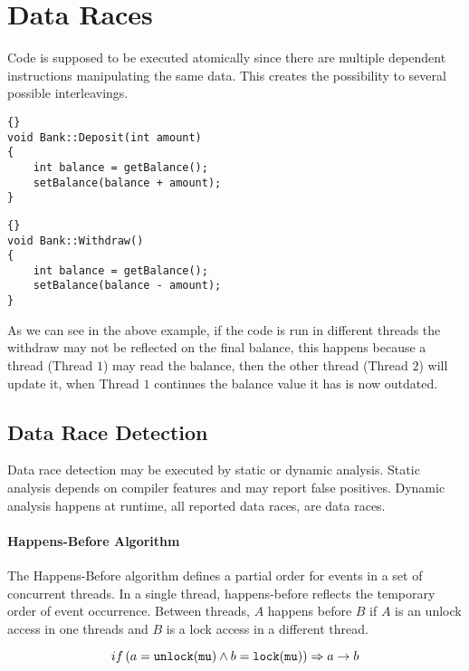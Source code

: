 \section{Data Races}
Code is supposed to be executed atomically since there are multiple dependent instructions manipulating the same data.
This creates the possibility to several possible interleavings.

\begin{lstlisting}[caption=Deposit Operation.]{}
void Bank::Deposit(int amount)
{
    int balance = getBalance();
    setBalance(balance + amount);
}
\end{lstlisting}

\begin{lstlisting}[caption=Withdraw Operation.]{}
void Bank::Withdraw()
{
    int balance = getBalance();
    setBalance(balance - amount);
}
\end{lstlisting}

As we can see in the above example,
if the code is run in different threads the withdraw may not be reflected on the final balance,
this happens because a thread (Thread $1$) may read the balance,
then the other thread (Thread $2$) will update it,
when Thread $1$ continues the balance value it has is now outdated.

\subsection{Data Race Detection}

Data race detection may be executed by static or dynamic analysis.
Static analysis depends on compiler features and may report false positives.
Dynamic analysis happens at runtime, all reported data races, are data races.

\paragraph{Happens-Before Algorithm}
The Happens-Before algorithm defines a partial order for events in a set of concurrent threads.
In a single thread, happens-before reflects the temporary order of event occurrence.
Between threads, $A$ happens before $B$ if $A$ is an unlock access in one threads
and $B$ is a lock access in a different thread.

\begin{equation}
    \mathnormal{if}\left(a = \mathtt{unlock(mu)} \wedge b = \mathtt{lock(mu)}\right) \Rightarrow a \rightarrow b
\end{equation}

